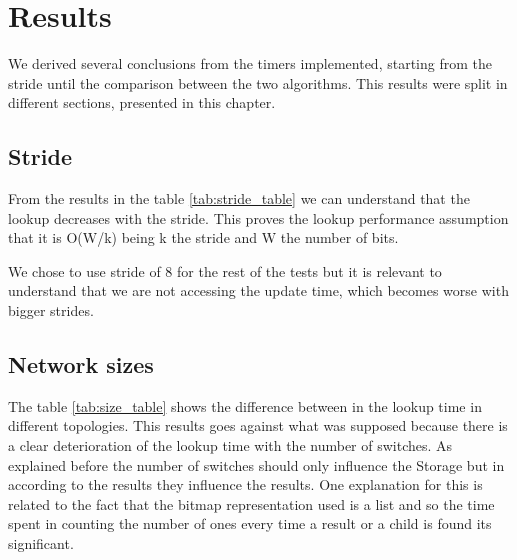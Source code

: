 \documentclass[]{report}
\begin{document}
\chapter{Results}
We derived several conclusions from the timers implemented, starting from the stride until the comparison between the two algorithms. This results were split in different sections, presented in this chapter.


\section{Stride}
From the results in the table \ref{tab:stride_table} we can understand that the lookup decreases with the stride. This proves the lookup performance assumption that it is O(W/k) being k the stride and W the number of bits.

We chose to use stride of 8 for the rest of the tests but it is relevant to understand that we are not accessing the update time, which becomes worse with bigger strides.



\begin{minipage}{\linewidth}%
\label{tab:stride_table}
\end{minipage}

\section{Network sizes}
	The table \ref{tab:size_table} shows the difference between in the lookup time in different topologies. This results goes against what was supposed because there is a clear deterioration of the lookup time with the number of switches. 
As explained before the number of switches should only influence the Storage but in according to the results they influence the results. One explanation for this is related to the fact that the bitmap representation used is a list and so the time spent in counting the number of ones every time a result or a child is found its significant.
\end{document}

